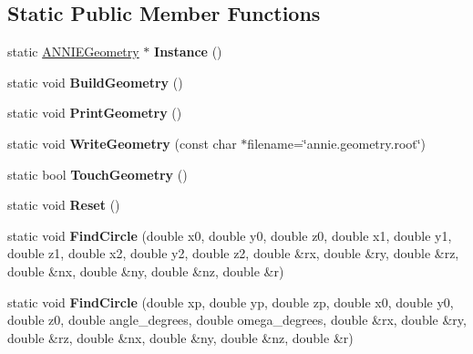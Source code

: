 \subsection*{Static Public Member Functions}
\begin{DoxyCompactItemize}
\item 
\hypertarget{classANNIEGeometry_ac5019e6c5628d0381760a43169b1f69c}{
static \hyperlink{classANNIEGeometry}{ANNIEGeometry} $\ast$ {\bfseries Instance} ()}
\label{classANNIEGeometry_ac5019e6c5628d0381760a43169b1f69c}

\item 
\hypertarget{classANNIEGeometry_ad5cc6f1a59adcc81ed32baf70fffe80a}{
static void {\bfseries BuildGeometry} ()}
\label{classANNIEGeometry_ad5cc6f1a59adcc81ed32baf70fffe80a}

\item 
\hypertarget{classANNIEGeometry_a263767eee59a5cf354f3f78ff11efe15}{
static void {\bfseries PrintGeometry} ()}
\label{classANNIEGeometry_a263767eee59a5cf354f3f78ff11efe15}

\item 
\hypertarget{classANNIEGeometry_ae6ac4bbd93009837fb6dd876eec7a558}{
static void {\bfseries WriteGeometry} (const char $\ast$filename=\char`\"{}annie.geometry.root\char`\"{})}
\label{classANNIEGeometry_ae6ac4bbd93009837fb6dd876eec7a558}

\item 
\hypertarget{classANNIEGeometry_a1bb496b1b3f0f3ef86a76dc59571beb7}{
static bool {\bfseries TouchGeometry} ()}
\label{classANNIEGeometry_a1bb496b1b3f0f3ef86a76dc59571beb7}

\item 
\hypertarget{classANNIEGeometry_a8d2c6faa5bdc504fb70967551ad59068}{
static void {\bfseries Reset} ()}
\label{classANNIEGeometry_a8d2c6faa5bdc504fb70967551ad59068}

\item 
\hypertarget{classANNIEGeometry_a6de654c497e0f352fc293cfc87246a0f}{
static void {\bfseries FindCircle} (double x0, double y0, double z0, double x1, double y1, double z1, double x2, double y2, double z2, double \&rx, double \&ry, double \&rz, double \&nx, double \&ny, double \&nz, double \&r)}
\label{classANNIEGeometry_a6de654c497e0f352fc293cfc87246a0f}

\item 
\hypertarget{classANNIEGeometry_ab8f9b0fa3e34b1524146e536cb0d61b8}{
static void {\bfseries FindCircle} (double xp, double yp, double zp, double x0, double y0, double z0, double angle\_\-degrees, double omega\_\-degrees, double \&rx, double \&ry, double \&rz, double \&nx, double \&ny, double \&nz, double \&r)}
\label{classANNIEGeometry_ab8f9b0fa3e34b1524146e536cb0d61b8}


\end{DoxyCompactItemize}
